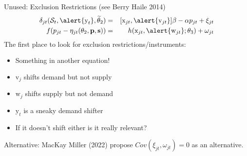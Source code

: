 


\begin{frame}{Unused: Exclusion Restrictions (see Berry Haile 2014)}
\begin{eqnarray*}
    \delta_{jt}(\mathcal{S}_t,\alert{\textrm{y}_t}, \widetilde{\theta}_2) &=&  [\textrm{x}_{jt}, \alert{\textrm{v}_{jt}}]  \beta  - \alpha p_{jt} + \xi_{jt}\\
    f(p_{jt} - \eta_{jt}(\theta_2,\mathbf{p},\mathbf{s})) &=&   h(\textrm{x}_{jt},\alert{\textrm{w}_{jt}};\theta_3)+\omega_{jt}
\end{eqnarray*}
The first place to look for exclusion restrictions/instruments:
\begin{itemize}
\item Something in another equation!
\item $\textrm{v}_j$ shifts demand but not supply
\item $\textrm{w}_j$ shifts supply but not demand
\item $\textrm{y}_t$ is a sneaky demand shifter
\item If it doesn't shift either is it really relevant?
\end{itemize}
Alternative: MacKay Miller (2022) propose $Cov(\xi_{jt},  \omega_{jt})=0$ as an alternative.
\end{frame}




